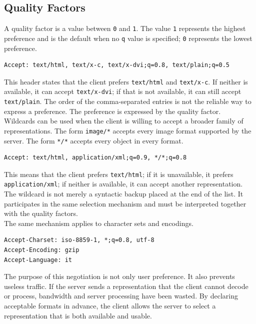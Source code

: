 \documentclass{scrbook}
\begin{document}
\subsection{Quality Factors}

A quality factor is a value between \texttt{0} and \texttt{1}. The value \texttt{1} represents the highest preference and is the default when no \texttt{q} value is specified; \texttt{0} represents the lowest preference.

\begin{lstlisting}
Accept: text/html, text/x-c, text/x-dvi;q=0.8, text/plain;q=0.5
\end{lstlisting}

This header states that the client prefers \texttt{text/html} and \texttt{text/x-c}. If neither is available, it can accept \texttt{text/x-dvi}; if that is not available, it can still accept \texttt{text/plain}. The order of the comma-separated entries is not the reliable way to express a preference. The preference is expressed by the quality factor.\\

Wildcards can be used when the client is willing to accept a broader family of representations. The form \texttt{image/*} accepts every image format supported by the server. The form \texttt{*/*} accepts every object in every format.

\begin{lstlisting}
Accept: text/html, application/xml;q=0.9, */*;q=0.8
\end{lstlisting}

This means that the client prefers \texttt{text/html}; if it is unavailable, it prefers \texttt{application/xml}; if neither is available, it can accept another representation. The wildcard is not merely a syntactic backup placed at the end of the list. It participates in the same selection mechanism and must be interpreted together with the quality factors.\\

The same mechanism applies to character sets and encodings.

\begin{lstlisting}
Accept-Charset: iso-8859-1, *;q=0.8, utf-8
Accept-Encoding: gzip
Accept-Language: it
\end{lstlisting}

The purpose of this negotiation is not only user preference. It also prevents useless traffic. If the server sends a representation that the client cannot decode or process, bandwidth and server processing have been wasted. By declaring acceptable formats in advance, the client allows the server to select a representation that is both available and usable.
\end{document}
